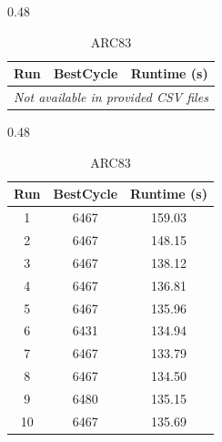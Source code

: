 \documentclass[12pt,a4paper]{article}
\begin{document}
\begin{table}[t]
\begin{subtable}{0.48\textwidth}
\centering
\caption{SCHOLL}
\begin{tabular}{ccc}
\toprule
Run & BestCycle & Runtime (s) \\
\midrule
\multicolumn{3}{c}{\textit{Not available in provided CSV files}} \\
\bottomrule
\end{tabular}
\end{subtable}
\hfill
\begin{subtable}{0.48\textwidth}
\centering
\caption{ARC83}
\begin{tabular}{ccc}
\toprule
Run & BestCycle & Runtime (s) \\
\midrule
1  & 6467 & 159.03 \\
2  & 6467 & 148.15 \\
3  & 6467 & 138.12 \\
4  & 6467 & 136.81 \\
5  & 6467 & 135.96 \\
6  & 6431 & 134.94 \\
7  & 6467 & 133.79 \\
8  & 6467 & 134.50 \\
9  & 6480 & 135.15 \\
10 & 6467 & 135.69 \\
\bottomrule
\end{tabular}
\end{subtable}

\end{table}
\end{document}
